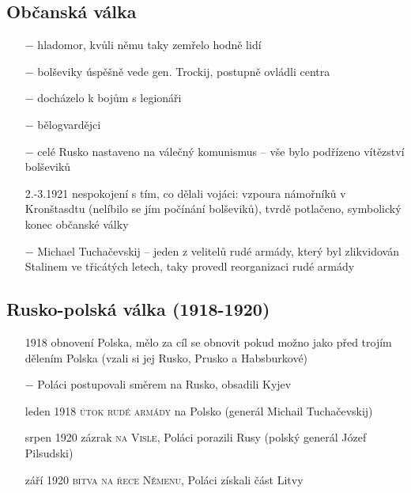 \documentclass{article}
\begin{document}
\subsection*{Občanská válka}
\begin{itemize}
    \vspace{-0.5em}
    \setlength\itemsep{0.15em}
    \item[$-$] hladomor, kvůli němu taky zemřelo hodně lidí
    \item[$-$] bolševiky úspěšně vede gen. Trockij, postupně ovládli centra
    \item[$-$] docházelo k bojům s legionáři
    \item[$-$] bělogvardějci
    \item[$-$] celé Rusko nastaveno na válečný komunismus -- vše bylo podřízeno vítězství bolševiků
    \item[2.-3.1921] nespokojení s tím, co dělali vojáci: vzpoura námořníků v Kronštasdtu (nelíbilo se jím počínání bolševiků), tvrdě potlačeno, symbolický konec občanské války
    \item[$-$] Michael Tuchačevskij -- jeden z velitelů rudé armády, který byl zlikvidován Stalinem ve třicátých letech, taky provedl reorganizaci rudé armády
\end{itemize}

\subsection*{Rusko-polská válka (1918-1920)}
\begin{itemize}
    \vspace{-0.5em}
    \setlength\itemsep{0.15em}
    \item[1918] obnovení Polska, mělo za cíl se obnovit pokud možno jako před trojím dělením Polska (vzali si jej Rusko, Prusko a Habsburkové)
    \item[$-$] Poláci postupovali směrem na Rusko, obsadili Kyjev
    \item[leden 1918] \textsc{útok rudé armády} na Polsko (generál Michail Tuchačevskij)
    \item[srpen 1920] zázrak \textsc{na Visle}, Poláci porazili Rusy (polský generál Józef Pilsudski)
    \item[září 1920] \textsc{bitva na řece Němenu}, Poláci získali část Litvy
\end{itemize}
\end{document}
